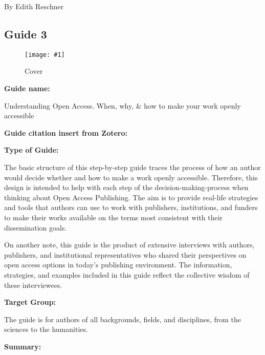 \documentclass{article}
\newlength{\imgwidth}
\newcommand\scaledgraphics[2]{%
                
\settowidth{\imgwidth}{\texttt{[image: \#1]}}%
                
\setlength{\imgwidth}{\minof{\imgwidth}{#2\textwidth}}%
                
\texttt{[image: \#1]}%
                
}
\begin{document}
By Edith Reschner 


\subsection{Guide 3}\label{H1144211}


\begin{figure}
\scaledgraphics{37cc2dfd-e350-4e29-acc3-9c7f815eb133.png}{0.5}
\caption*{Cover}\label{F36070241}
\end{figure}























\textbf{Guide name:} 

Understanding Open Access. When, why, \& how to make your work openly accessible


\textbf{Guide citation insert from Zotero:} 

\autocite{rubow_understanding_2015}


\textbf{Type of Guide:}

The basic structure of this step-by-step guide traces the process of how an author would decide whether and how to make a work openly accessible. Therefore, this design is intended to help with each step of the decision-making-process when thinking about Open Access Publishing. The aim is to provide real-life strategies and tools that authors can use to work with publishers, institutions, and funders to make their works available on the terms most consistent with their dissemination goals.


On another note, this guide is the product of extensive interviews with authors, publishers, and institutional representatives who shared their perspectives on open access options in today’s publishing environment. The information, strategies, and examples included in this guide reflect the collective wisdom of these interviewees.


\textbf{Target Group:}

The guide is for authors of all backgrounds, fields, and disciplines, from the sciences to the humanities.


\textbf{Summary:}
\end{document}
